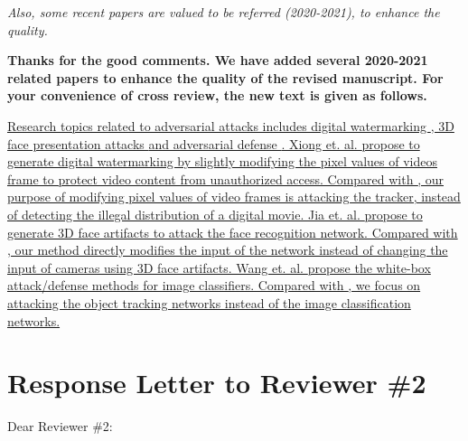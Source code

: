 \documentclass[12pt]{article}
\begin{document}
\textit{Also, some recent papers are valued to be referred (2020-2021), to enhance the quality.}

\textbf{Thanks for the good comments. We have added several 2020-2021 related papers to enhance the quality of the revised manuscript. For your convenience of cross review, the new text is given as follows.}

\uline{Research topics related to adversarial attacks includes digital watermarking \cite{9343885}, 3D face presentation attacks \cite{9294085} and adversarial defense \cite{9169672}.
Xiong et. al. \cite{9343885} propose to generate digital watermarking by slightly modifying the pixel values of videos frame to protect video content from unauthorized access. Compared with \cite{9343885}, our purpose of modifying pixel values of video frames is attacking the tracker, instead of detecting the illegal distribution of a digital movie.
Jia et. al. \cite{9294085} propose to generate 3D face artifacts to attack the face recognition network. Compared with \cite{9294085}, our method directly modifies the input of the network instead of changing the input of cameras using 3D face artifacts.
Wang et. al. \cite{9169672} propose the white-box attack/defense methods for image classifiers. Compared with \cite{9169672}, we focus on attacking the object tracking networks instead of the image classification networks.}

\newpage
{\centering\section*{Response Letter to Reviewer \#2}}
\noindent Dear Reviewer \#2:
\end{document}
